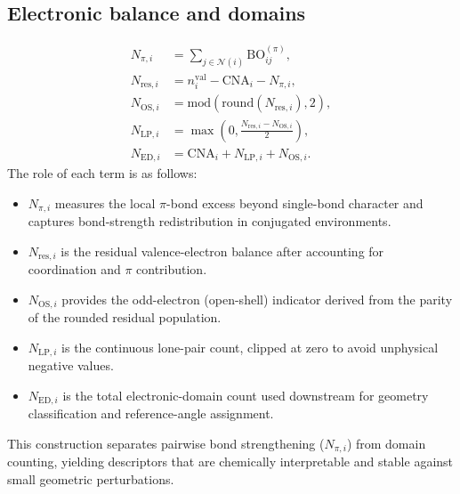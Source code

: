 \documentclass[journal=jctcce,manuscript=article]{achemso}
\begin{document}
\subsection{Electronic balance and domains}
\begin{align}
N_{\pi,i} &= \sum_{j\in\mathcal{N}(i)} \mathrm{BO}^{(\pi)}_{ij},\\
N_{\mathrm{res},i} &= n^{\mathrm{val}}_i-\mathrm{CNA}_i-N_{\pi,i},\\
N_{\mathrm{OS},i} &= \mathrm{mod}(\mathrm{round}(N_{\mathrm{res},i}),2),\\
N_{\mathrm{LP},i} &= \max\!\left(0,\frac{N_{\mathrm{res},i}-N_{\mathrm{OS},i}}{2}\right),\\
N_{\mathrm{ED},i} &= \mathrm{CNA}_i+N_{\mathrm{LP},i}+N_{\mathrm{OS},i}.
\end{align}
The role of each term is as follows:
\begin{itemize}
\item $N_{\pi,i}$ measures the local $\pi$-bond excess beyond single-bond character and captures bond-strength redistribution in conjugated environments.
\item $N_{\mathrm{res},i}$ is the residual valence-electron balance after accounting for coordination and $\pi$ contribution.
\item $N_{\mathrm{OS},i}$ provides the odd-electron (open-shell) indicator derived from the parity of the rounded residual population.
\item $N_{\mathrm{LP},i}$ is the continuous lone-pair count, clipped at zero to avoid unphysical negative values.
\item $N_{\mathrm{ED},i}$ is the total electronic-domain count used downstream for geometry classification and reference-angle assignment.
\end{itemize}
This construction separates pairwise bond strengthening ($N_{\pi,i}$) from domain counting, yielding descriptors that are chemically interpretable and stable against small geometric perturbations.
\end{document}
